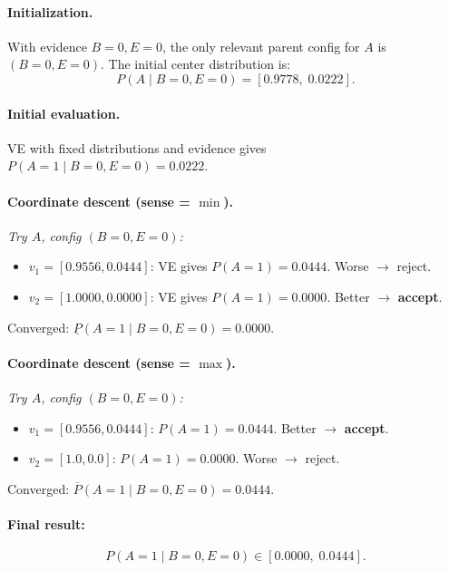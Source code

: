 \documentclass[11pt]{article}
\begin{document}
\paragraph{Initialization.}
With evidence $B{=}0, E{=}0$, the only relevant parent config for $A$ is $(B{=}0, E{=}0)$.
The initial center distribution is:
\[
  P(A \mid B{=}0, E{=}0) = [0.9778,\; 0.0222].
\]

\paragraph{Initial evaluation.}
VE with fixed distributions and evidence gives $P(A{=}1 \mid B{=}0, E{=}0) = 0.0222$.

\paragraph{Coordinate descent (sense = $\min$).}

\emph{Try $A$, config $(B{=}0, E{=}0)$:}
\begin{itemize}
  \item $v_1 = [0.9556, 0.0444]$: VE gives $P(A{=}1) = 0.0444$. Worse $\to$ reject.
  \item $v_2 = [1.0000, 0.0000]$: VE gives $P(A{=}1) = 0.0000$. Better $\to$ \textbf{accept}.
\end{itemize}

Converged: $\underline{P}(A{=}1 \mid B{=}0, E{=}0) = 0.0000$.

\paragraph{Coordinate descent (sense = $\max$).}

\emph{Try $A$, config $(B{=}0, E{=}0)$:}
\begin{itemize}
  \item $v_1 = [0.9556, 0.0444]$: $P(A{=}1) = 0.0444$. Better $\to$ \textbf{accept}.
  \item $v_2 = [1.0, 0.0]$: $P(A{=}1) = 0.0000$. Worse $\to$ reject.
\end{itemize}

Converged: $\overline{P}(A{=}1 \mid B{=}0, E{=}0) = 0.0444$.

\paragraph{Final result:}
\[
  \boxed{P(A{=}1 \mid B{=}0, E{=}0) \in [0.0000,\; 0.0444].}
\]
\end{document}

